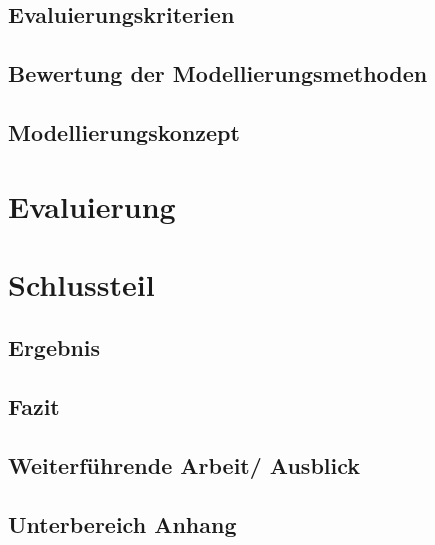 \documentclass[a4paper, 12pt, twoside, headsepline=true]{scrartcl} %
\begin{document}
\subsection{Evaluierungskriterien}

\subsection{Bewertung der Modellierungsmethoden}

\subsection{Modellierungskonzept}

\newpage

\section{Evaluierung}

\newpage

\section{Schlussteil}

\subsection{Ergebnis}

\subsection{Fazit}

\subsection{Weiterführende Arbeit/ Ausblick}

\newpage

\printbibliography[heading=none]
\newpage
{}
\subsection*{Unterbereich Anhang}
\end{document}
